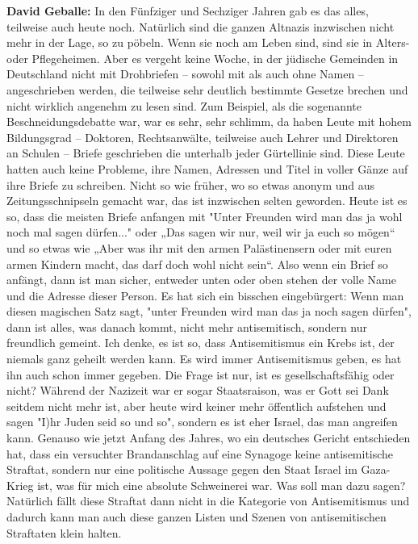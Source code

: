\textbf{David Geballe:} In den Fünfziger und Sechziger Jahren gab es das alles, teilweise auch heute noch. Natürlich sind die ganzen Altnazis inzwischen nicht mehr in der Lage, so zu pöbeln. Wenn sie noch am Leben sind, sind sie in Alters- oder Pflegeheimen. Aber es vergeht keine Woche, in der jüdische Gemeinden in Deutschland nicht mit Drohbriefen – sowohl mit als auch ohne Namen – angeschrieben werden, die teilweise sehr deutlich bestimmte Gesetze brechen und nicht wirklich angenehm zu lesen sind. Zum Beispiel, als die sogenannte Beschneidungsdebatte war, war es sehr, sehr schlimm, da haben Leute mit hohem Bildungsgrad – Doktoren, Rechtsanwälte, teilweise auch Lehrer und Direktoren an Schulen – Briefe geschrieben die unterhalb jeder Gürtellinie sind. Diese Leute hatten auch keine Probleme, ihre Namen, Adressen und Titel in voller Gänze auf ihre Briefe zu schreiben. Nicht so wie früher, wo so etwas anonym und aus Zeitungsschnipseln gemacht war, das ist inzwischen selten geworden. Heute ist es so, dass die meisten Briefe anfangen mit "Unter Freunden wird man das ja wohl noch mal sagen dürfen..." oder „Das sagen wir nur, weil wir ja euch so mögen“ und so etwas wie „Aber was ihr mit den armen Palästinensern oder mit euren armen Kindern macht, das darf doch wohl nicht sein“. Also wenn ein Brief so anfängt, dann ist man sicher, entweder unten oder oben stehen der volle Name und die Adresse dieser Person. Es hat sich ein bisschen eingebürgert: Wenn man diesen magischen Satz sagt, "unter Freunden wird man das ja noch sagen dürfen", dann ist alles, was danach kommt, nicht mehr antisemitisch, sondern nur freundlich gemeint. 
Ich denke, es ist so, dass Antisemitismus ein Krebs ist, der niemals ganz geheilt werden kann. Es wird immer Antisemitismus geben, es hat ihn auch schon immer gegeben. Die Frage ist nur, ist es gesellschaftsfähig oder nicht? Während der Nazizeit war er sogar Staatsraison, was er Gott sei Dank seitdem nicht mehr ist, aber heute wird keiner mehr öffentlich aufstehen und sagen "I)hr Juden seid so und so", sondern es ist eher Israel, das man angreifen kann. Genauso wie jetzt Anfang des Jahres, wo ein deutsches Gericht entschieden hat, dass ein versuchter Brandanschlag auf eine Synagoge keine antisemitische Straftat, sondern nur eine politische Aussage gegen den Staat Israel im Gaza-Krieg ist, was für mich eine absolute Schweinerei war. Was soll man dazu sagen? Natürlich fällt diese Straftat dann nicht in die Kategorie von Antisemitismus und dadurch kann man auch diese ganzen Listen und Szenen von antisemitischen Straftaten klein halten. 

